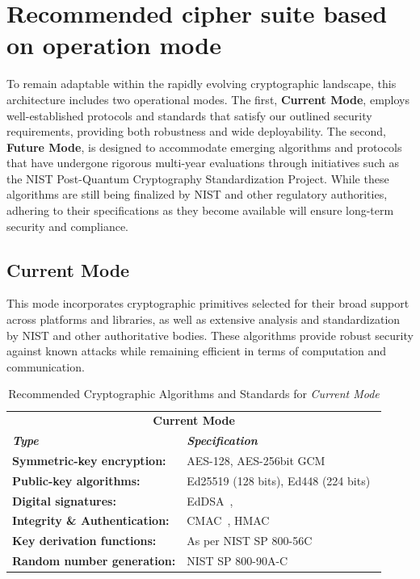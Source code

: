 \documentclass[pdflatex,sn-mathphys-num]{sn-jnl}%
\theoremstyle{thmstyleone}%
\theoremstyle{thmstyletwo}%
\theoremstyle{thmstylethree}%
\begin{document}
\section{Recommended cipher suite based on operation mode}
\label{sec:2:ciphersuitematrix}


To remain adaptable within the rapidly evolving cryptographic landscape, this architecture includes two operational modes. The first, \textbf{Current Mode}, employs well-established protocols and standards that satisfy our outlined security requirements, providing both robustness and wide deployability. The second, \textbf{Future Mode}, is designed to accommodate emerging algorithms and protocols that have undergone rigorous multi-year evaluations through initiatives such as the NIST Post-Quantum Cryptography Standardization Project. While these algorithms are still being finalized by NIST and other regulatory authorities, adhering to their specifications as they become available will ensure long-term security and compliance.






\subsection{Current Mode}

This mode incorporates cryptographic primitives selected for their broad support across platforms and libraries, as well as extensive analysis and standardization by NIST and other authoritative bodies. These algorithms provide robust security against known attacks while remaining efficient in terms of computation and communication.

\begin{table}[h!]
    \centering
    \begin{tabular}{@{}p{} p{}@{}}
        \hline
        \multicolumn{2}{c}{\textbf{Current Mode}} \\ 
        \textbf{\textit{Type}} & \textbf{\textit{Specification}} \\
        \hline
        \textbf{Symmetric-key encryption:} & AES-128, AES-256bit GCM~\cite{NIST-GMAC} \\
        \textbf{Public-key algorithms:} & Ed25519 (128 bits), Ed448 (224 bits)~\cite{NIST-ECC-recom} \\
        \textbf{Digital signatures:} &  EdDSA~\cite{NIST-ECC-recom},~\cite{nist-fips-186-5} \\
        \textbf{Integrity \& Authentication:} & CMAC~\cite{NIST-CMAC}, HMAC \\
        \textbf{Key derivation functions:} & As per NIST SP 800-56C~\cite{NIST-800-56C}\\
        \textbf{Random number generation:} & NIST SP 800-90A-C~\cite{nist80090a} \\
        \hline
    \end{tabular}
    \caption{Recommended Cryptographic Algorithms and Standards for \emph{Current Mode}}
    \label{table:crypto-algorithms-cm}
\end{table}
\end{document}
